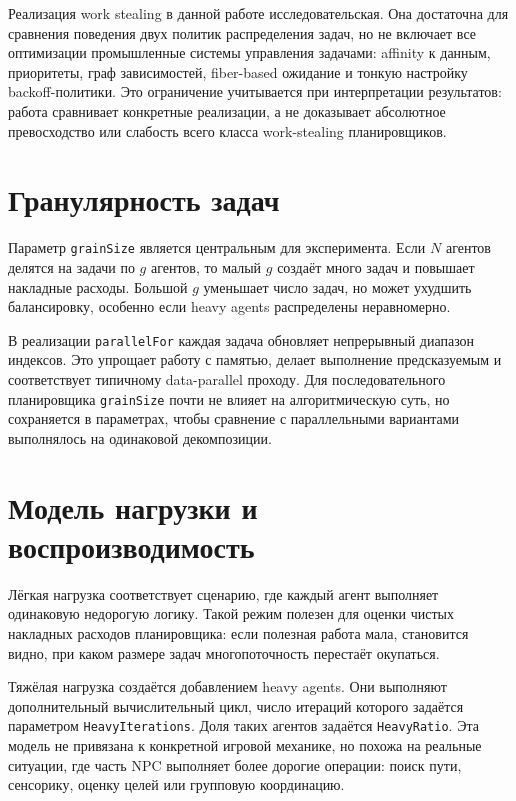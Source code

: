 \documentclass[14pt,a4paper,oneside]{extreport}
\begin{document}
Реализация work stealing в данной работе исследовательская. Она достаточна для сравнения поведения двух политик распределения задач, но не включает все оптимизации промышленные системы управления задачами: affinity к данным, приоритеты, граф зависимостей, fiber-based ожидание и тонкую настройку backoff-политики. Это ограничение учитывается при интерпретации результатов: работа сравнивает конкретные реализации, а не доказывает абсолютное превосходство или слабость всего класса work-stealing планировщиков.

\section{Гранулярность задач}

Параметр \texttt{grainSize} является центральным для эксперимента. Если \(N\) агентов делятся на задачи по \(g\) агентов, то малый \(g\) создаёт много задач и повышает накладные расходы. Большой \(g\) уменьшает число задач, но может ухудшить балансировку, особенно если heavy agents распределены неравномерно.

В реализации \texttt{parallelFor} каждая задача обновляет непрерывный диапазон индексов. Это упрощает работу с памятью, делает выполнение предсказуемым и соответствует типичному data-parallel проходу. Для последовательного планировщика \texttt{grainSize} почти не влияет на алгоритмическую суть, но сохраняется в параметрах, чтобы сравнение с параллельными вариантами выполнялось на одинаковой декомпозиции.

\section{Модель нагрузки и воспроизводимость}

Лёгкая нагрузка соответствует сценарию, где каждый агент выполняет одинаковую недорогую логику. Такой режим полезен для оценки чистых накладных расходов планировщика: если полезная работа мала, становится видно, при каком размере задач многопоточность перестаёт окупаться.

Тяжёлая нагрузка создаётся добавлением heavy agents. Они выполняют дополнительный вычислительный цикл, число итераций которого задаётся параметром \texttt{HeavyIterations}. Доля таких агентов задаётся \texttt{HeavyRatio}. Эта модель не привязана к конкретной игровой механике, но похожа на реальные ситуации, где часть NPC выполняет более дорогие операции: поиск пути, сенсорику, оценку целей или групповую координацию.
\end{document}
